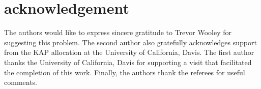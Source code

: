 \documentclass{amsart}%
\numberwithin{equation}{section}
\theoremstyle{remark}
\newcommand{\1}{\mathbbm{1}}
\begin{document}











\section*{acknowledgement}
The authors would like to express sincere gratitude to Trevor Wooley for suggesting this problem. The second author also gratefully acknowledges support from the KAP allocation at the University of California, Davis. The first author thanks the University of California, Davis for supporting a visit that facilitated the completion  of this work. Finally, the authors thank the referees for useful comments. 






\end{document}
